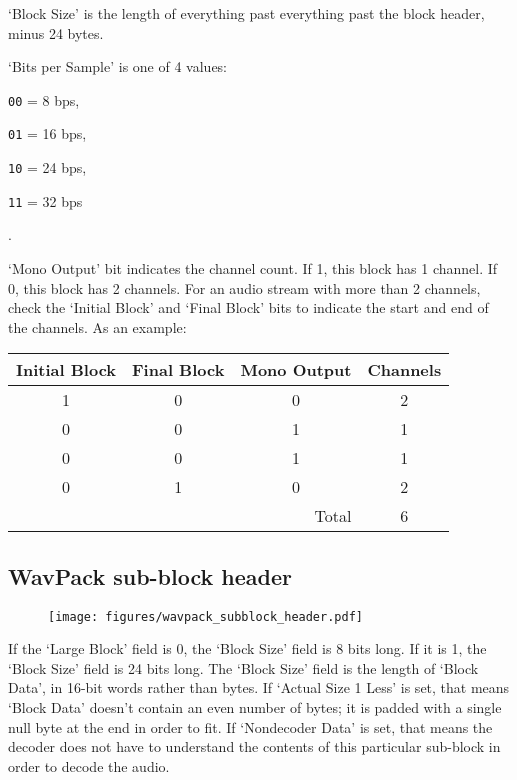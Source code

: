 `Block Size' is the length of everything past everything past the
block header, minus 24 bytes.

`Bits per Sample' is one of 4 values:

\begin{inparaenum}
\item[\texttt{00} = ] 8 bps,
\item[\texttt{01} = ] 16 bps,
\item[\texttt{10} = ] 24 bps,
\item[\texttt{11} = ] 32 bps
\end{inparaenum}
.

`Mono Output' bit indicates the channel count.
If 1, this block has 1 channel.
If 0, this block has 2 channels.
For an audio stream with more than 2 channels,
check the `Initial Block' and `Final Block' bits to indicate
the start and end of the channels.  As an example:

\begin{tabular}{c|c|c|c}
Initial Block & Final Block & Mono Output & Channels \\
\hline
1 & 0 & 0 & 2 \\
0 & 0 & 1 & 1 \\
0 & 0 & 1 & 1 \\
0 & 1 & 0 & 2 \\
\hline
\multicolumn{3}{r|}{Total} & 6
\end{tabular}

\subsection{WavPack sub-block header}
\begin{figure}[h]
\texttt{[image: figures/wavpack\_subblock\_header.pdf]}
\end{figure}
\par
\noindent
If the `Large Block' field is 0, the `Block Size' field is 8 bits long.
If it is 1, the `Block Size' field is 24 bits long.
The `Block Size' field is the length of `Block Data', in 16-bit
words rather than bytes.
If `Actual Size 1 Less' is set, that means `Block Data' doesn't contain
an even number of bytes; it is padded with a single null byte at the
end in order to fit.
If `Nondecoder Data' is set, that means the decoder does not have
to understand the contents of this particular sub-block in
order to decode the audio.
